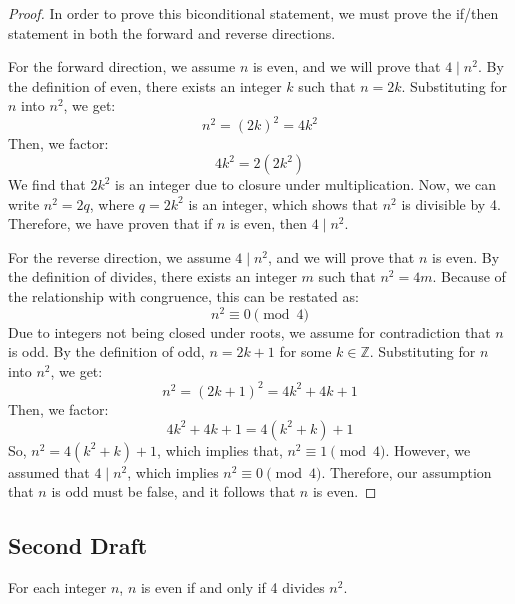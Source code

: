 \begin{proof}
    In order to prove this biconditional statement, we must prove the if/then statement in both the forward and reverse directions.

    \vspace{1em}

    For the forward direction, we assume \( n \) is even, and we will prove that \( 4 \mid n^2 \). By the definition of even, there exists an integer \( k \) such that \( n = 2k \). Substituting for \( n \) into \( n^2 \), we get:
    \[ n^2 = (2k)^2 = 4k^2 \]
    Then, we factor:
    \[ 4k^2 = 2(2k^2) \]
    We find that \( 2k^2 \) is an integer due to closure under multiplication. Now, we can write \( n^2 = 2q \), where \( q = 2k^2 \) is an integer, which shows that \( n^2 \) is divisible by 4. Therefore, we have proven that if \( n \) is even, then \( 4 \mid n^2 \).

    \vspace{1em}

    For the reverse direction, we assume \( 4 \mid n^2 \), and we will prove that \( n \) is even. By the definition of divides, there exists an integer \( m \) such that \( n^2 = 4m \). Because of the relationship with congruence, this can be restated as:
    \[ n^2 \equiv 0 \pmod{4} \]
    Due to integers not being closed under roots, we assume for contradiction that \( n \) is odd. By the definition of odd, \( n = 2k + 1 \) for some \( k \in \mathbb{Z} \). Substituting for \( n \) into \( n^2 \), we get:
    \[ n^2 = (2k + 1)^2 = 4k^2 + 4k + 1 \]
    Then, we factor:
    \[ 4k^2 + 4k + 1 = 4(k^2 + k) + 1 \]
    So, \( n^2 = 4(k^2 + k) + 1 \), which implies that, \( n^2 \equiv 1 \pmod{4} \). However, we assumed that \( 4 \mid n^2 \), which implies \( n^2 \equiv 0 \pmod{4} \). Therefore, our assumption that \( n \) is odd must be false, and it follows that \( n \) is even.
\end{proof}

\newpage


\subsection{Second Draft}

\begin{theorem}
    For each integer \( n \), \( n \) is even if and only if 4 divides \( n^2 \).
\end{theorem}

